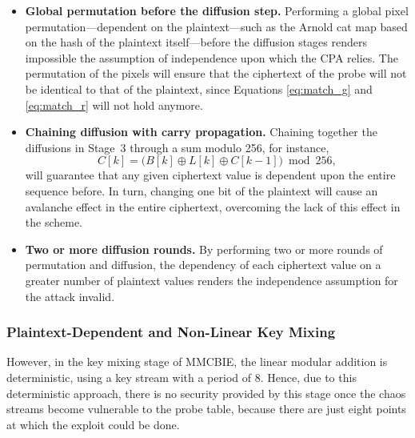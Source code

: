 \begin{itemize}
    \item \textbf{Global permutation before the diffusion step.} Performing a
    global pixel permutation---dependent on the plaintext---such as the
    Arnold cat map based on the hash of the plaintext itself---before the
    diffusion stages renders impossible the assumption of independence upon which
    the CPA relies. The permutation of the pixels will ensure that the ciphertext
    of the probe will not be identical to that of the plaintext, since Equations
    \eqref{eq:match_g} and \eqref{eq:match_r} will not hold anymore.

    \item \textbf{Chaining diffusion with carry propagation.} Chaining together
    the diffusions in Stage~3 through a sum modulo 256, for instance,
    \begin{equation}
        C[k] = \bigl(B[k] \oplus L[k] \oplus C[k-1]\bigr) \bmod 256,
        \label{eq:chained_diff}
    \end{equation}
    will guarantee that any given ciphertext value is dependent upon the entire
    sequence before. In turn, changing one bit of the plaintext will cause an avalanche
    effect in the entire ciphertext, overcoming the lack of this effect in the scheme.

    \item \textbf{Two or more diffusion rounds.} By performing two or more rounds
    of permutation and diffusion, the dependency of each ciphertext value on a greater
    number of plaintext values renders the independence assumption for the attack invalid.
\end{itemize}

\subsubsection{Plaintext-Dependent and Non-Linear Key Mixing}

However, in the key mixing stage of MMCBIE, the linear modular addition is deterministic,
using a key stream with a period of 8. Hence, due to this deterministic approach, there
is no security provided by this stage once the chaos streams become vulnerable to the
probe table, because there are just eight points at which the exploit could be done.

